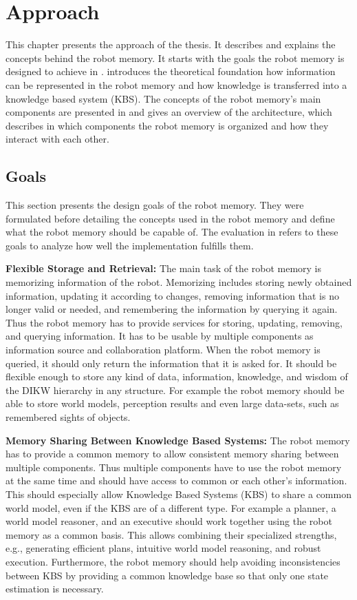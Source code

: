 \chapter{Approach}
\label{chap:approach}
This chapter presents the approach of the thesis. It describes and
explains the concepts behind the robot memory. It starts with the
goals the robot memory is designed to achieve in
.  introduces the theoretical
foundation how information can be represented in the robot memory and
how knowledge is transferred into a knowledge based system (KBS). The
concepts of the robot memory's main components are presented in
 and  gives an overview
of the architecture, which describes in which components the robot
memory is organized and how they interact with each other.

\section{Goals}
\label{sec:goals}
This section presents the design goals of the robot memory. They were
formulated before detailing the concepts used in the robot memory and
define what the robot memory should be capable of. The evaluation in
 refers to these goals to analyze how well
the implementation fulfills them.

\textbf{Flexible Storage and Retrieval:} The main task of
the robot memory is memorizing information of the robot. Memorizing
includes storing newly obtained information, updating it according to
changes, removing information that is no longer valid or needed, and
remembering the information by querying it again. Thus the robot
memory has to provide services for storing, updating, removing, and
querying information.  It has to be usable by multiple components
as information source and collaboration platform.  When the robot memory is queried, it should
only return the information that it is asked for. It should be flexible
enough to store any kind of data, information, knowledge, and wisdom
of the DIKW hierarchy in any structure. For example the robot memory
should be able to store world models, perception results and even
large data-sets, such as remembered sights of objects.

\textbf{Memory Sharing Between Knowledge Based Systems:}
The robot memory has to provide a common memory to allow consistent
memory sharing between multiple components. Thus multiple components have to
use the robot memory at the same time and should have access to common
or each other's information. This should especially allow Knowledge
Based Systems (KBS) to share a common world model, even if the KBS are
of a different type. For example a planner, a world model reasoner,
and an executive should work together using the robot memory as a
common basis. This allows combining their specialized strengths,
e.g., generating efficient plans, intuitive world model reasoning, and
robust execution. Furthermore, the robot memory should help avoiding
inconsistencies between KBS by providing a common knowledge base so that
only one state estimation is necessary.

